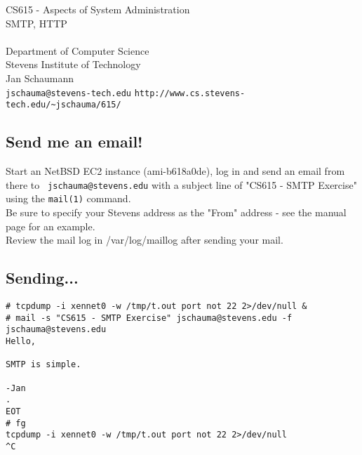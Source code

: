 \documentclass[xga]{xdvislides}
\begin{document}
\setfontphv

\lhead{\slidetitle}                               %
\cfoot{\relax}                               %
\rfoot{\Gray{\today}}

\newcommand{\smallish}{\fontsize{16}{16}\selectfont}

\vspace*{\fill}
\begin{center}
	\Hugesize
		CS615 - Aspects of System Administration\\ [1em]
		SMTP, HTTP \\ [1em]
	\hspace*{5mm}\blueline\\ [1em]
	\Normalsize
		Department of Computer Science\\
		Stevens Institute of Technology\\
		Jan Schaumann\\
		\verb+jschauma@stevens-tech.edu+
		\verb+http://www.cs.stevens-tech.edu/~jschauma/615/+
\end{center}
\vspace*{\fill}

\subsection{Send me an email!}

\vspace*{\fill}
Start an NetBSD EC2 instance (ami-b618a0de), log in
and send an email from there to {\tt
jschauma@stevens.edu} with a subject line of "CS615 -
SMTP Exercise" using the {\tt mail(1)} command. \\

Be sure to specify your Stevens address as the "From"
address - see the manual page for an example.\\

Review the mail log in /var/log/maillog after sending
your mail.
\vspace*{\fill}

\subsection{Sending...}
\begin{verbatim}
# tcpdump -i xennet0 -w /tmp/t.out port not 22 2>/dev/null &
# mail -s "CS615 - SMTP Exercise" jschauma@stevens.edu -f jschauma@stevens.edu
Hello,

SMTP is simple.

-Jan
.
EOT
# fg
tcpdump -i xennet0 -w /tmp/t.out port not 22 2>/dev/null
^C
\end{verbatim}
\end{document}
